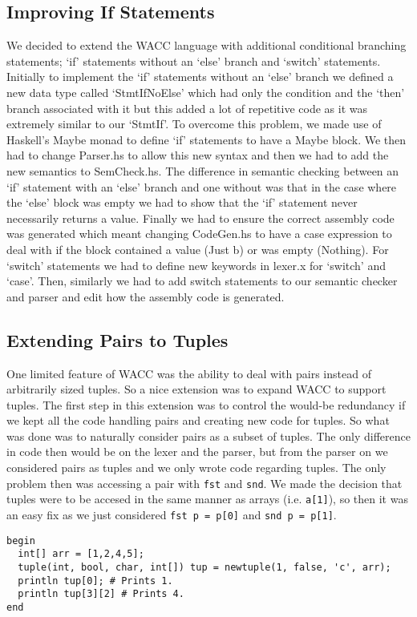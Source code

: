 \documentclass{article}
\begin{document}
\subsection{Improving If Statements}
We decided to extend the WACC language with additional conditional branching statements; `if' statements without an `else' branch and `switch' statements. Initially to implement the `if' statements without an `else' branch we defined a new data type called `StmtIfNoElse' which had only the condition and the `then' branch associated with it but this added a lot of repetitive code as it was extremely similar to our `StmtIf'. To overcome this problem, we made use of Haskell's Maybe monad to  define `if' statements to have a Maybe block. We then had to change Parser.hs to allow this new syntax and then we had to add the new semantics to SemCheck.hs. The difference in semantic checking between an `if' statement with an `else' branch and one without was that in the case where the `else' block was empty we had to show that the `if' statement never necessarily returns a value.  Finally we had to ensure the correct assembly code was generated which meant changing CodeGen.hs to have a case expression to deal with if the block contained a value (Just b) or was empty (Nothing).
For `switch' statements we had to define new keywords in lexer.x for `switch' and `case'. Then, similarly we had to add switch statements to our semantic checker and parser and edit how the assembly code is generated.
\subsection{Extending Pairs to Tuples}
One limited feature of WACC was the ability to deal with pairs instead of arbitrarily sized tuples. So a nice extension was to expand WACC to support tuples. The first step in this extension was to control the would-be redundancy if we kept all the code handling pairs and creating new code for tuples. So what was done was to naturally consider pairs as a subset of tuples. The only difference in code then would be on the lexer and the parser, but from the parser on we considered pairs as tuples and we only wrote code regarding tuples. The only problem then was accessing a pair with \texttt{fst} and \texttt{snd}. We made the decision that tuples were to be accesed in the same manner as arrays (i.e. \texttt{a[1]}), so then it  was an easy fix as we just considered \texttt{fst p = p[0]} and \texttt{snd p = p[1]}.

\begin{lstlisting}
begin
  int[] arr = [1,2,4,5];
  tuple(int, bool, char, int[]) tup = newtuple(1, false, 'c', arr);
  println tup[0]; # Prints 1.
  println tup[3][2] # Prints 4.
end
\end{lstlisting}
\end{document}
